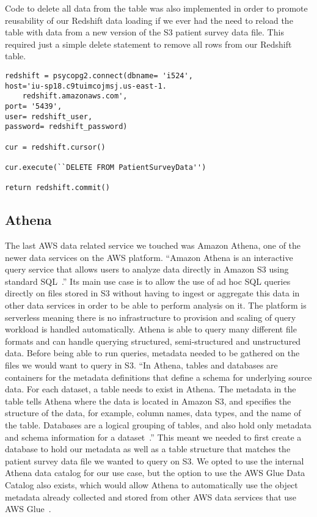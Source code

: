 Code to delete all data from the table was also implemented in order to 
promote reusability of our Redshift data loading if we ever had the need to 
reload the table with data from a new version of the S3 patient survey data 
file. This required just a simple delete statement to remove all rows from our 
Redshift table. 

\begin{verbatim}
redshift = psycopg2.connect(dbname= 'i524', 
host='iu-sp18.c9tuimcojmsj.us-east-1.
	redshift.amazonaws.com',
port= '5439', 
user= redshift_user, 
password= redshift_password)

cur = redshift.cursor()

cur.execute(``DELETE FROM PatientSurveyData'')

return redshift.commit()
\end{verbatim}

\subsection{Athena}

The last AWS data related service we touched was Amazon Athena, one of the 
newer data services on the AWS platform. ``Amazon Athena is an interactive 
query service that allows users to analyze data directly in Amazon S3 using 
standard SQL~\cite{hid-sp18-521-whatisathena}.'' Its main use case is to allow 
the use of ad hoc SQL queries directly on files stored in S3 without having 
to ingest or aggregate this data in other data services in order to be able to 
perform analysis on it. The platform is serverless meaning there is no 
infrastructure to provision and scaling of query workload is handled 
automatically. Athena is able to query many different file formats and can 
handle querying structured, semi-structured and unstructured data. Before 
being able to run queries, metadata needed to be gathered on the files we 
would want to query in S3. ``In Athena, tables and databases are containers 
for the metadata definitions that define a schema for underlying source data. 
For each dataset, a table needs to exist in Athena. The metadata in the table 
tells Athena where the data is located in Amazon S3, and specifies the 
structure of the data, for example, column names, data types, and the name of 
the table. Databases are a logical grouping of tables, and also hold only 
metadata and schema information for a 
dataset~\cite{hid-sp18-521-whatisathena}.'' This meant we needed to first 
create a database to hold our metadata as well as a table structure that 
matches the patient survey data file we wanted to query on S3. We opted to use 
the internal Athena data catalog for our use case, but the option to use the 
AWS Glue Data Catalog also exists, which would allow Athena to automatically 
use the object metadata already collected and stored from other AWS data 
services that use AWS Glue~\cite{hid-sp18-521-whatisathena}.  

